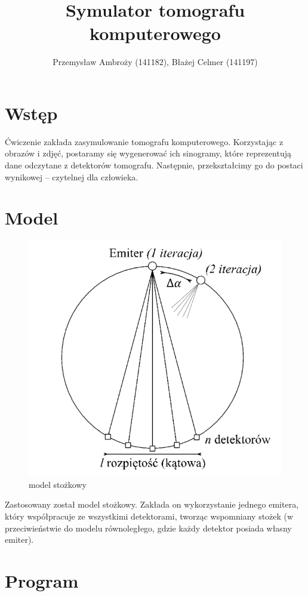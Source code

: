 \documentclass[polish,polish,a4paper]{article}
\title{Symulator tomografu komputerowego}
\author{Przemysław Ambroży (141182), Błażej Celmer (141197)}
\begin{document}
 
	\maketitle
	
	\section{Wstęp}
		Ćwiczenie zakłada zasymulowanie tomografu komputerowego. 
		Korzystając z obrazów i zdjęć, postaramy się wygenerować ich sinogramy, 
		które reprezentują dane odczytane z detektorów tomografu.
		Następnie, przekształcimy go do postaci wynikowej -- czytelnej dla człowieka.
 	
	\section{Model}
			\begin{figure}[h]
				\centering
				\includegraphics[scale=0.7]{img/model.png}
				\caption{model stożkowy}
			\end{figure}
		\noindent Zastosowany został model stożkowy.
		 Zakłada on wykorzystanie jednego emitera,
		  który współpracuje ze wszystkimi detektorami, tworząc wspomniany stożek 
		  (w przeciwieństwie do modelu równoległego, gdzie każdy detektor posiada własny emiter).
		
	\section{Program}
\end{document}
